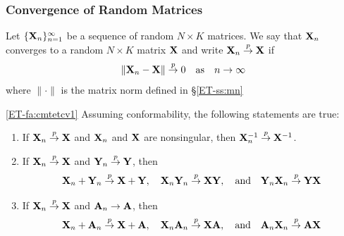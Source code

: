 \begin{frame}\frametitle{Convergence of Random Matrices}

    \vspace{2em}
    Let $\{\mathbf X_n\}_{n=1}^{\infty}$ be a sequence of random
    $N \times K$ matrices.  We say that $\mathbf X_n$ converges to a random $N
    \times K$ matrix $\mathbf X$  and write $\mathbf X_n \stackrel { p } {\to}
    \mathbf X$ if 
    \begin{equation*}
        \| \mathbf X_n - \mathbf X \| \stackrel { p } {\to} 0
        \quad \text{as} \quad n \to \infty
    \end{equation*}
    where $\| \cdot \|$ is the matrix norm defined in \S\ref{ET-ss:mn}
    
\end{frame}

\begin{frame}

    \vspace{2em}
    \Fact\eqref{ET-fa:cmtetcv1}
    Assuming conformability, the following statements are true:
    \begin{enumerate}
        \item If $\mathbf X_n \stackrel { p } {\to} \mathbf X$ and $\mathbf X_n$ and $\mathbf X$ are 
            nonsingular, then $\mathbf X_n^{-1} \stackrel { p } {\to} \mathbf X^{-1}$.
        \item If $\mathbf X_n \stackrel { p } {\to} \mathbf X$ and $\mathbf Y_n \stackrel { p } {\to} \mathbf Y$, then
            \begin{equation*}
                \mathbf X_n + \mathbf Y_n \stackrel { p } {\to} \mathbf X + \mathbf Y,
                \quad
                \mathbf X_n \mathbf Y_n \stackrel { p } {\to} \mathbf X \mathbf Y,
                \quad \text{and} \quad
                \mathbf Y_n \mathbf X_n \stackrel { p } {\to} \mathbf Y \mathbf X
            \end{equation*}
        \item If $\mathbf X_n \stackrel { p } {\to} \mathbf X$ and $\mathbf A_n \to \mathbf A$, then
            \begin{equation*}
                \mathbf X_n + \mathbf A_n \stackrel { p } {\to} \mathbf X + \mathbf A,
                \quad
                \mathbf X_n \mathbf A_n \stackrel { p } {\to} \mathbf X \mathbf A,
                \quad \text{and} \quad
                \mathbf A_n \mathbf X_n \stackrel { p } {\to} \mathbf A \mathbf X
            \end{equation*}
     \seti        %
    \end{enumerate}
    
\end{frame}

